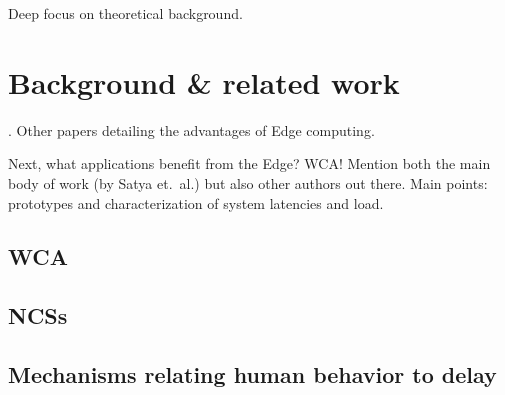Deep focus on theoretical background.

\section{Background \& related work}
\textcite{Satya2009Case}.
Other papers detailing the advantages of Edge computing.

Next, what applications benefit from the Edge?
\gls{WCA}! Mention both the main body of work (by Satya et.\ al.) but also other authors out there.
Main points: prototypes and characterization of system latencies and load.

\subsection{\acs{WCA}}
\subsection{\acsp{NCS}}
\subsection{\acs{Mechanisms relating human behavior to delay}}
